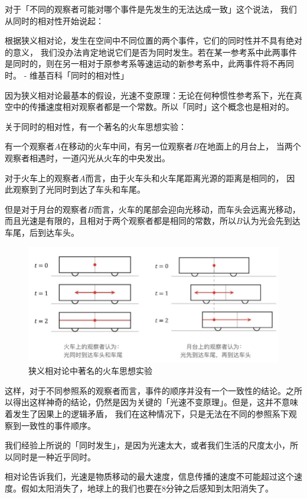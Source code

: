 \documentclass[cn,11pt,chinese]{elegantbook}
\renewenvironment{quote}{\begin{customblockquote}\list{}{\rightmargin=0em\leftmargin=0em}%
\item\relax\color{blockquote-text}\ignorespaces}{\unskip\unskip\endlist\end{customblockquote}}
\begin{document}
对于「不同的观察者可能对哪个事件是先发生的无法达成一致」这个说法，
我们从同时的相对性开始说起：

\begin{quote}
根据狭义相对论，发生在空间中不同位置的两个事件，它们的同时性并不具有绝对的意义，
我们没办法肯定地说它们是否为同时发生。若在某一参考系中此两事件是同时的，则在另一相对于原参考系等速运动的新参考系中，此两事件将不再同时。
- 维基百科「同时的相对性」
\end{quote}

因为狭义相对论最基本的假设，光速不变原理：无论在何种惯性参考系下，光在真空中的传播速度相对观察者都是一个常数。所以「同时」这个概念也是相对的。

关于同时的相对性，有一个著名的火车思想实验：

有一个观察者\(A\)在移动的火车中间，有另一位观察者\(B\)在地面上的月台上，
当两个观察者相遇时，一道闪光从火车的中央发出。

对于火车上的观察者\(A\)而言，由于火车头和火车尾距离光源的距离是相同的，
因此观察到了光同时到达了车头和车尾。

但是对于月台的观察者\(B\)而言，火车的尾部会迎向光移动，而车头会远离光移动，而且光速是有限的，且相对于两个观察者都是相同的常数，所以\(B\)认为光会先到达车尾，后到达车头。

\begin{figure}
\centering
\includegraphics{images/appendix-a-06.jpeg}
\caption{狭义相对论中著名的火车思想实验}
\end{figure}

这样，对于不同参照系的观察者而言，事件的顺序并没有一个一致性的结论。之所以得出这样神奇的结论，仍然是因为关键的「光速不变原理」。但是，这并不意味着发生了因果上的逻辑矛盾，
我们在这种情况下，只是无法在不同的参照系下观察到一致性的事件顺序。

我们经验上所说的「同时发生」，是因为光速太大，或者我们生活的尺度太小，所以同时是一种近乎同时。

相对论告诉我们，光速是物质移动的最大速度，信息传播的速度不可能超过这个速度。假如太阳消失了，地球上的我们也要在8分钟之后感知到太阳消失了。
\end{document}
